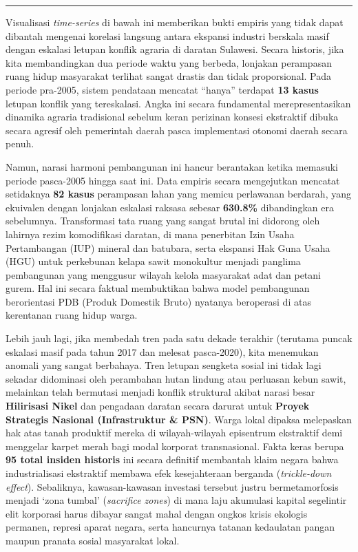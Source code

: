 \documentclass[
]{article}
\begin{document}
\begin{center}\rule{0.5\linewidth}{0.5pt}\end{center}

Visualisasi \emph{time-series} di bawah ini memberikan bukti empiris
yang tidak dapat dibantah mengenai korelasi langsung antara ekspansi
industri berskala masif dengan eskalasi letupan konflik agraria di
daratan Sulawesi. Secara historis, jika kita membandingkan dua periode
waktu yang berbeda, lonjakan perampasan ruang hidup masyarakat terlihat
sangat drastis dan tidak proporsional. Pada periode pra-2005, sistem
pendataan mencatat ``hanya'' terdapat \textbf{13 kasus} letupan konflik
yang tereskalasi. Angka ini secara fundamental merepresentasikan
dinamika agraria tradisional sebelum keran perizinan konsesi ekstraktif
dibuka secara agresif oleh pemerintah daerah pasca implementasi otonomi
daerah secara penuh.

Namun, narasi harmoni pembangunan ini hancur berantakan ketika memasuki
periode pasca-2005 hingga saat ini. Data empiris secara mengejutkan
mencatat setidaknya \textbf{82 kasus} perampasan lahan yang memicu
perlawanan berdarah, yang ekuivalen dengan lonjakan eskalasi raksasa
sebesar \textbf{630.8\%} dibandingkan era sebelumnya. Transformasi tata
ruang yang sangat brutal ini didorong oleh lahirnya rezim komodifikasi
daratan, di mana penerbitan Izin Usaha Pertambangan (IUP) mineral dan
batubara, serta ekspansi Hak Guna Usaha (HGU) untuk perkebunan kelapa
sawit monokultur menjadi panglima pembangunan yang menggusur wilayah
kelola masyarakat adat dan petani gurem. Hal ini secara faktual
membuktikan bahwa model pembangunan berorientasi PDB (Produk Domestik
Bruto) nyatanya beroperasi di atas kerentanan ruang hidup warga.

Lebih jauh lagi, jika membedah tren pada satu dekade terakhir (terutama
puncak eskalasi masif pada tahun 2017 dan melesat pasca-2020), kita
menemukan anomali yang sangat berbahaya. Tren letupan sengketa sosial
ini tidak lagi sekadar didominasi oleh perambahan hutan lindung atau
perluasan kebun sawit, melainkan telah bermutasi menjadi konflik
struktural akibat narasi besar \textbf{Hilirisasi Nikel} dan pengadaan
daratan secara darurat untuk \textbf{Proyek Strategis Nasional
(Infrastruktur \& PSN)}. Warga lokal dipaksa melepaskan hak atas tanah
produktif mereka di wilayah-wilayah episentrum ekstraktif demi menggelar
karpet merah bagi modal korporat transnasional. Fakta keras berupa
\textbf{95 total insiden historis} ini secara definitif membantah klaim
negara bahwa industrialisasi ekstraktif membawa efek kesejahteraan
berganda (\emph{trickle-down effect}). Sebaliknya, kawasan-kawasan
investasi tersebut justru bermetamorfosis menjadi `zona tumbal'
(\emph{sacrifice zones}) di mana laju akumulasi kapital segelintir elit
korporasi harus dibayar sangat mahal dengan ongkos krisis ekologis
permanen, represi aparat negara, serta hancurnya tatanan kedaulatan
pangan maupun pranata sosial masyarakat lokal.
\end{document}
